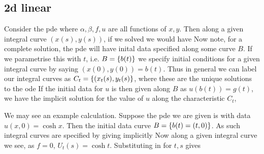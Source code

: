 \documentclass{article}
\begin{document}
\subsection{2d linear}
Consider the pde
where $\alpha,\beta,f,u$ are all functions of $x,y$. Then along a given integral curve $(x(s),y(s))$, if we solved 
we would have 
Now note, for a complete solution, the pde will have inital data specified along some curve $B$. If we parametrise this with $t$, i.e. $B = \left\{ b(t) \right\}$ we specify initial conditions for a given integral curve by saying $(x(0),y(0)) = b(t)$. Thus in general we can label our integral curves as $C_t = \left\{ (x_t(s),y_t(s) \right\}$, where these are the unique solutions to the ode
If the initial data for $u$ is then given along $B$ as $u(b(t)) = g(t)$, we have the implicit solution for the value of $u$ along the characteristic $C_t$,
\begin{example}
We may see an example calculation. Suppose the pde we are given is 
with data $u(x,0) = \cosh x$. Then the initial data curve $B = \left\{ b(t) = (t,0) \right\}$. As such integral curves are specified by 
giving implicitly
Now along a given integral curve we see, as $f=0$, $U_t(s) = \cosh t$. Substituting in for $t,s$ gives 
\end{example}
\end{document}

